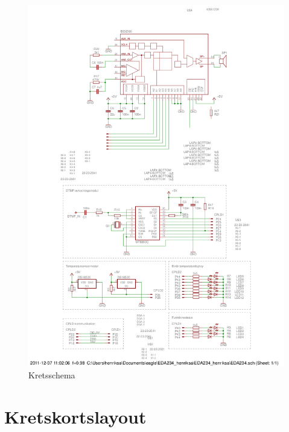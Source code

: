 \documentclass[a4paper,11pt]{article}
\begin{document}
		\begin{figure}[H]
		  \centering
		      \includegraphics[scale=0.65, angle=90]{schema.png}
		  	\caption{Kretsschema}
		  	\label{fig:schema}
		\end{figure}

	\section{Kretskortslayout}
\end{document}
